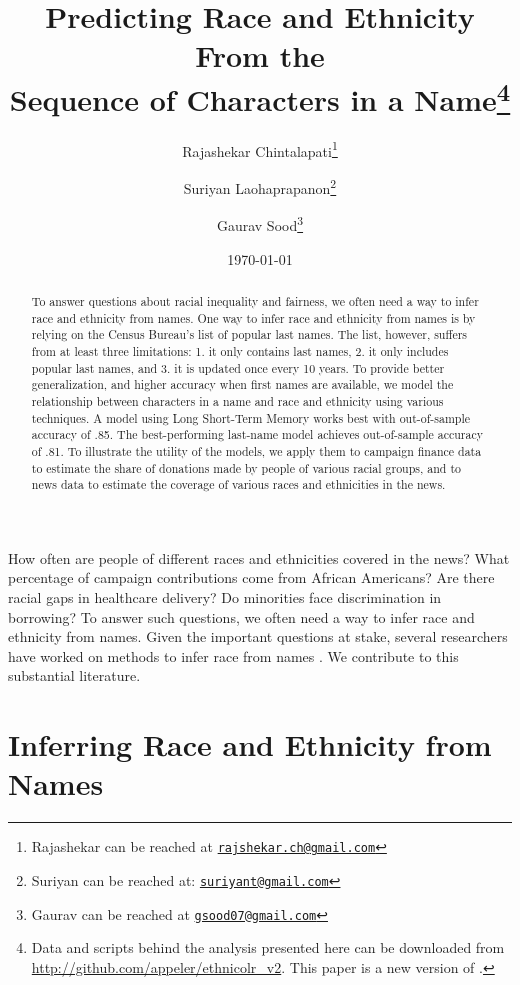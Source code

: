 \documentclass[12pt, letterpaper]{article}
\title{\Large{Predicting Race and Ethnicity From the\\Sequence of Characters in a Name}\footnote{Data and scripts behind the analysis presented here can be downloaded from \url{http://github.com/appeler/ethnicolr_v2}. This paper is a new version of \citet{sood2018predicting}.}}
\author{Rajashekar Chintalapati\thanks{Rajashekar can be reached at \href{mailto:rajshekar.ch@gmail.com}\texttt{rajshekar.ch@gmail.com}} 
\and Suriyan Laohaprapanon\thanks{Suriyan can be reached at: \href{mailto:suriyant@gmail.com}\texttt{suriyant@gmail.com}}
\and Gaurav Sood\thanks{Gaurav can be reached at \href{mailto:gsood07@gmail.com}\texttt{gsood07@gmail.com}}}
\date{\vspace{.5cm}\normalsize{\today}}
\begin{document}
\maketitle

\begin{abstract}
To answer questions about racial inequality and fairness, we often need a way to infer race and ethnicity from names. One way to infer race and ethnicity from names is by relying on the Census Bureau's list of popular last names. The list, however, suffers from at least three limitations: 1. it only contains last names, 2. it only includes popular last names, and 3. it is updated once every 10 years. To provide better generalization, and higher accuracy when first names are available, we model the relationship between characters in a name and race and ethnicity using various techniques. A model using Long Short-Term Memory works best with out-of-sample accuracy of .85. The best-performing last-name model achieves out-of-sample accuracy of .81. To illustrate the utility of the models, we apply them to campaign finance data to estimate the share of donations made by people of various racial groups, and to news data to estimate the coverage of various races and ethnicities in the news.
\end{abstract}
\clearpage
\doublespace

How often are people of different races and ethnicities covered in the news? What percentage of campaign contributions come from African Americans? Are there racial gaps in healthcare delivery? Do minorities face discrimination in borrowing? To answer such questions, we often need a way to infer race and ethnicity from names. Given the important questions at stake, several researchers have worked on methods to infer race from names \citep[see, e.g.,][]{ambekar2009name, fiscella2006use, imai2016improving, rosenman2022race}. We contribute to this substantial literature.

\section*{Inferring Race and Ethnicity from Names}
\end{document}
